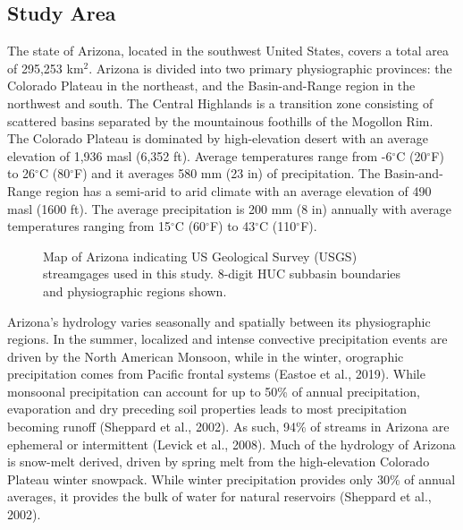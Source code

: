 \documentclass[
]{agujournal2019}
\begin{document}
\subsection{Study Area}\label{sec-study-area}

The state of Arizona, located in the southwest United States, covers a
total area of 295,253 km\(^2\). Arizona is divided into two primary
physiographic provinces: the Colorado Plateau in the northeast, and the
Basin-and-Range region in the northwest and south. The Central Highlands
is a transition zone consisting of scattered basins separated by the
mountainous foothills of the Mogollon Rim. The Colorado Plateau is
dominated by high-elevation desert with an average elevation of 1,936
masl (6,352 ft). Average temperatures range from -6\(^\circ\)C
(20\(^\circ\)F) to 26\(^\circ\)C (80\(^\circ\)F) and it averages 580 mm
(23 in) of precipitation. The Basin-and-Range region has a semi-arid to
arid climate with an average elevation of 490 masl (1600 ft). The
average precipitation is 200 mm (8 in) annually with average
temperatures ranging from 15\(^\circ\)C (60\(^\circ\)F) to 43\(^\circ\)C
(110\(^\circ\)F).

\begin{figure}


\caption{\label{fig-study-area}Map of Arizona indicating US Geological
Survey (USGS) streamgages used in this study. 8-digit HUC subbasin
boundaries and physiographic regions shown.}

\end{figure}%

Arizona's hydrology varies seasonally and spatially between its
physiographic regions. In the summer, localized and intense convective
precipitation events are driven by the North American Monsoon, while in
the winter, orographic precipitation comes from Pacific frontal systems
(Eastoe et al., 2019). While monsoonal precipitation can account for up
to 50\% of annual precipitation, evaporation and dry preceding soil
properties leads to most precipitation becoming runoff (Sheppard et al.,
2002). As such, 94\% of streams in Arizona are ephemeral or intermittent
(Levick et al., 2008). Much of the hydrology of Arizona is snow-melt
derived, driven by spring melt from the high-elevation Colorado Plateau
winter snowpack. While winter precipitation provides only 30\% of annual
averages, it provides the bulk of water for natural reservoirs (Sheppard
et al., 2002).
\end{document}
